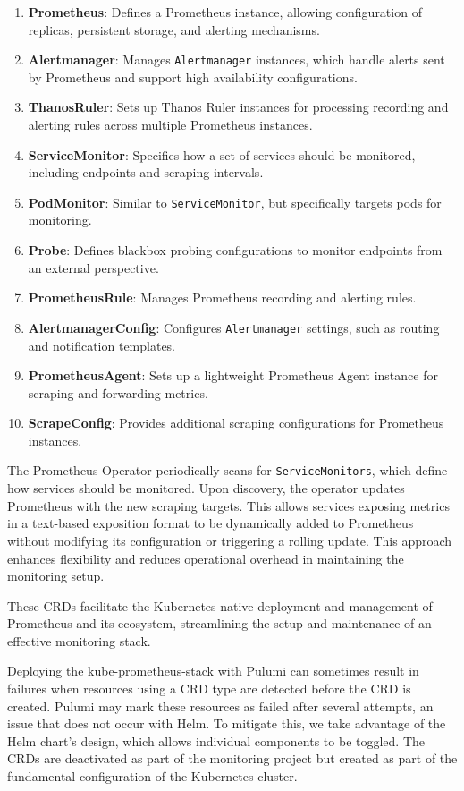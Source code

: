 \begin{enumerate}
    \item \textbf{Prometheus}: Defines a Prometheus instance, allowing configuration of replicas, persistent storage, and alerting mechanisms.
    \item \textbf{Alertmanager}: Manages \texttt{Alertmanager} instances, which handle alerts sent by Prometheus and support high availability configurations.
    \item \textbf{ThanosRuler}: Sets up Thanos Ruler instances for processing recording and alerting rules across multiple Prometheus instances.
    \item \textbf{ServiceMonitor}: Specifies how a set of services should be monitored, including endpoints and scraping intervals.
    \item \textbf{PodMonitor}: Similar to \texttt{ServiceMonitor}, but specifically targets pods for monitoring.
    \item \textbf{Probe}: Defines blackbox probing configurations to monitor endpoints from an external perspective.
    \item \textbf{PrometheusRule}: Manages Prometheus recording and alerting rules.
    \item \textbf{AlertmanagerConfig}: Configures \texttt{Alertmanager} settings, such as routing and notification templates.
    \item \textbf{PrometheusAgent}: Sets up a lightweight Prometheus Agent instance for scraping and forwarding metrics.
    \item \textbf{ScrapeConfig}: Provides additional scraping configurations for Prometheus instances.
\end{enumerate}

The Prometheus Operator periodically scans for \texttt{ServiceMonitors}, which define how services should be monitored. Upon discovery, the operator updates Prometheus with the new scraping targets. This allows services exposing metrics in a text-based exposition format to be dynamically added to Prometheus without modifying its configuration or triggering a rolling update. This approach enhances flexibility and reduces operational overhead in maintaining the monitoring setup.

These CRDs facilitate the Kubernetes-native deployment and management of Prometheus and its ecosystem, streamlining the setup and maintenance of an effective monitoring stack.

Deploying the kube-prometheus-stack with Pulumi can sometimes result in failures when resources using a CRD type are detected before the CRD is created. Pulumi may mark these resources as failed after several attempts, an issue that does not occur with Helm. To mitigate this, we take advantage of the Helm chart's design, which allows individual components to be toggled. The CRDs are deactivated as part of the monitoring project but created as part of the fundamental configuration of the Kubernetes cluster.

